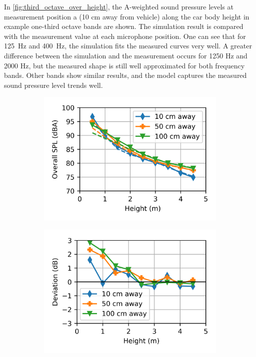 In \cref{fig:third_octave_over_height}, the A-weighted sound pressure levels at measurement position a (10 cm away from vehicle) along the car body height in example one-third octave bands are shown. The simulation result is compared with the measurement value at each microphone position. One can see that for \SI{125}{\hertz} and \SI{400}{\hertz}, the simulation fits the measured curves very well. A greater difference between the simulation and the measurement occurs for 1250 Hz and 2000 Hz, but the measured shape is still well approximated for both frequency bands. Other bands show similar results, and the model captures the measured sound pressure level trends well.

\begin{figure}%
	\centering
	\begin{subfigure}[b]{0.49\textwidth}
		\centering
		\includegraphics{fig/chap5/initial_model/overall_SPL/all_pos.png}
	\end{subfigure}
	\hfill
	\begin{subfigure}[b]{0.49\textwidth}
		\centering
		\includegraphics{fig/chap5/initial_model/overall_SPL/deviation.png}

\end{subfigure}
\end{figure}

